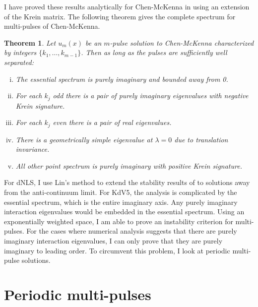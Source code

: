 \documentclass[12pt,reqno,oneside]{amsart}
\newtheorem{theorem}{Theorem}
\theoremstyle{definition}
\theoremstyle{remark}
\begin{document}
I have proved these results analytically for Chen-McKenna in \cite{Kap2019} using an extension of the Krein matrix. The following theorem gives the complete spectrum for multi-pulses of Chen-McKenna. 

\begin{theorem}\label{Cheneigs}
Let $u_m(x)$ be an $m$-pulse solution to Chen-McKenna characterized by integers $\{ k_1, \dots, k_{m-1} \}$. Then as long as the pulses are sufficiently well separated:
\begin{enumerate}[(i)]
\item The essential spectrum is purely imaginary and bounded away from 0.
\item For each $k_j$ odd there is a pair of purely imaginary eigenvalues with negative Krein signature.
\item For each $k_j$ even there is a pair of real eigenvalues.
\item There is a geometrically simple eigenvalue at $\lambda = 0$ due to translation invariance.
\item All other point spectrum is purely imaginary with positive Krein signature.
\end{enumerate}
\end{theorem}

For dNLS, I use Lin's method to extend the stability results of \cite{Kapitula2001,Kapitula2001a} to solutions away from the anti-continuum limit. For KdV5, the analysis is complicated by the essential spectrum, which is the entire imaginary axis. Any purely imaginary interaction eigenvalues would be embedded in the essential spectrum. Using an exponentially weighted space, I am able to prove an instability criterion for multi-pulses. For the cases where numerical analysis suggests that there are purely imaginary interaction eigenvalues, I can only prove that they are purely imaginary to leading order. To circumvent this problem, I look at periodic multi-pulse solutions.

\section{Periodic multi-pulses}
\end{document}
